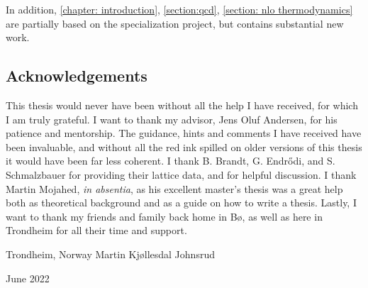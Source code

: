 In addition, \autoref{chapter: introduction}, \autoref{section:qcd}, \autoref{section: nlo thermodynamics} are partially based on the specialization project, but contains substantial new work.


\subsection*{Acknowledgements}


This thesis would never have been without all the help I have received, for which I am truly grateful.
I want to thank my advisor, Jens Oluf Andersen, for his patience and mentorship.
The guidance, hints and comments I have received have been invaluable, and without all the red ink spilled on older versions of this thesis it would have been far less coherent.
I thank B. Brandt, G. Endr\H{o}di, and S. Schmalzbauer for providing their lattice data, and for helpful discussion.
I thank Martin Mojahed, \emph{in absentia}, as his excellent master's thesis was a great help both as theoretical background and as a guide on how to write a thesis.
Lastly, I want to thank my friends and family back home in Bø, as well as here in Trondheim for all their time and support.


\vspace*{\fill}

{
    \noindent
    Trondheim, Norway \hfill Martin Kjøllesdal Johnsrud

    \noindent
    June 2022
}